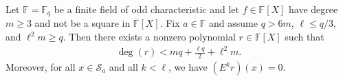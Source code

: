 \begin{proposition}\label{prop:stepanov-polynomial} \leanok {}
  Let $\mathbb{F} = \mathbb{F}_q$ be a finite field of odd characteristic and let $f \in \mathbb{F}[X]$ have degree $m \geq 3$ and not be a square in $\overline{\mathbb{F}}[X]$. Fix $a \in \mathbb{F}$ and assume $q > 6m$, $\ell \leq q/3$, and $\ell^2 m \geq q$. Then there exists a nonzero polynomial $r \in \mathbb{F}[X]$ such that
  \begin{align*}
    \deg(r) < mq + \frac{\ell q}{2} + \ell^2 m.
  \end{align*}
  Moreover, for all $x \in \mathcal{S}_a$ and all $k < \ell$, we have $(E^k r)(x) = 0$.
\end{proposition}

